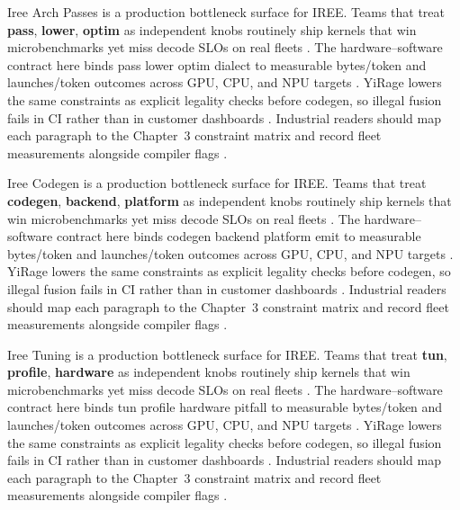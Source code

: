 Iree Arch Passes is a production bottleneck surface for IREE. Teams that treat \textbf{pass}, \textbf{lower}, \textbf{optim} as independent knobs routinely ship kernels that win microbenchmarks yet miss decode SLOs on real fleets \citep{taxbreak2026,semianalysis2024tma}. The hardware--software contract here binds pass lower optim dialect to measurable bytes/token and launches/token outcomes across GPU, CPU, and NPU targets \citep{memoryfloor2026,amd2024xdna}. YiRage lowers the same constraints as explicit legality checks before codegen, so illegal fusion fails in CI rather than in customer dashboards \citep{nvidia2022hopper,amd2024aie}. Industrial readers should map each paragraph to the Chapter~3 constraint matrix and record fleet measurements alongside compiler flags \citep{semianalysis2024tma,dlbook}.

Iree Codegen is a production bottleneck surface for IREE. Teams that treat \textbf{codegen}, \textbf{backend}, \textbf{platform} as independent knobs routinely ship kernels that win microbenchmarks yet miss decode SLOs on real fleets \citep{memoryfloor2026,amd2024xdna}. The hardware--software contract here binds codegen backend platform emit to measurable bytes/token and launches/token outcomes across GPU, CPU, and NPU targets \citep{nvidia2022hopper,amd2024aie}. YiRage lowers the same constraints as explicit legality checks before codegen, so illegal fusion fails in CI rather than in customer dashboards \citep{semianalysis2024tma,dlbook}. Industrial readers should map each paragraph to the Chapter~3 constraint matrix and record fleet measurements alongside compiler flags \citep{amd2024xdna,dao2022flashattention}.

Iree Tuning is a production bottleneck surface for IREE. Teams that treat \textbf{tun}, \textbf{profile}, \textbf{hardware} as independent knobs routinely ship kernels that win microbenchmarks yet miss decode SLOs on real fleets \citep{nvidia2022hopper,amd2024aie}. The hardware--software contract here binds tun profile hardware pitfall to measurable bytes/token and launches/token outcomes across GPU, CPU, and NPU targets \citep{semianalysis2024tma,dlbook}. YiRage lowers the same constraints as explicit legality checks before codegen, so illegal fusion fails in CI rather than in customer dashboards \citep{amd2024xdna,dao2022flashattention}. Industrial readers should map each paragraph to the Chapter~3 constraint matrix and record fleet measurements alongside compiler flags \citep{amd2024aie,kwon2023vllm}.


